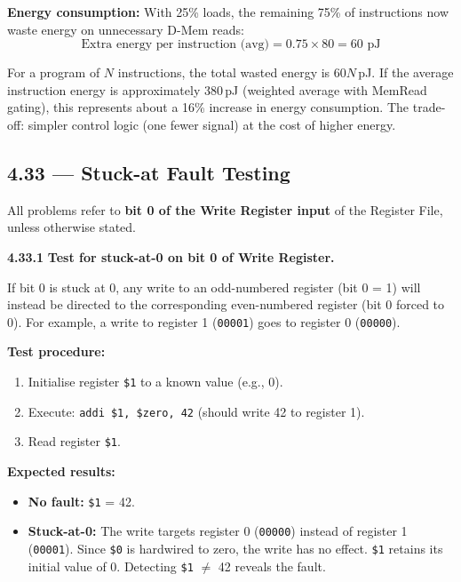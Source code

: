 \textbf{Energy consumption:}  With 25\% loads, the remaining 75\% of
instructions now waste energy on unnecessary D-Mem reads:
\[
\text{Extra energy per instruction (avg)} = 0.75 \times 80 = 60 \text{ pJ}
\]

\noindent For a program of $N$ instructions, the total wasted energy is
$60N$\,pJ.  If the average instruction energy is approximately 380\,pJ
(weighted average with MemRead gating), this represents about a 16\% increase
in energy consumption.  The trade-off: simpler control logic (one fewer signal)
at the cost of higher energy.

\subsection*{4.33 --- Stuck-at Fault Testing}
\hypertarget{sol-4.33}{}

All problems refer to \textbf{bit 0 of the Write Register input} of the
Register File, unless otherwise stated.

\medskip\noindent\textbf{4.33.1}
\textbf{Test for stuck-at-0 on bit 0 of Write Register.}

If bit 0 is stuck at 0, any write to an odd-numbered register (bit 0 = 1)
will instead be directed to the corresponding even-numbered register
(bit 0 forced to 0).  For example, a write to register 1 (\texttt{00001})
goes to register 0 (\texttt{00000}).

\textbf{Test procedure:}
\begin{enumerate}
\item Initialise register \texttt{\$1} to a known value (e.g., 0).
\item Execute: \texttt{addi \$1, \$zero, 42}
      \quad (should write 42 to register 1).
\item Read register \texttt{\$1}.
\end{enumerate}

\textbf{Expected results:}
\begin{itemize}
\item \textbf{No fault:} \texttt{\$1} = 42. \checkmark
\item \textbf{Stuck-at-0:} The write targets register 0 (\texttt{00000})
      instead of register 1 (\texttt{00001}).  Since \texttt{\$0} is
      hardwired to zero, the write has no effect.  \texttt{\$1} retains its
      initial value of 0.  Detecting \texttt{\$1} $\neq$ 42 reveals the fault.
\end{itemize}

